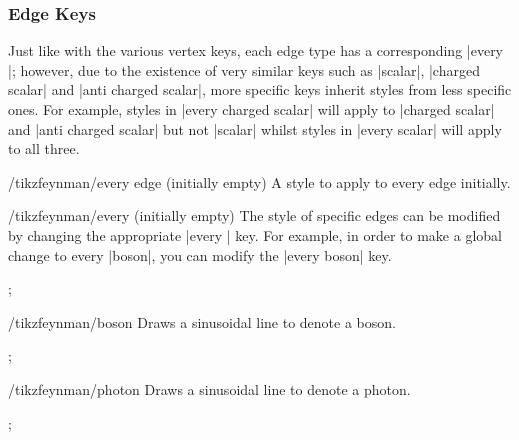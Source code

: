 \documentclass[a4paper,final]{ltxdoc}
\begin{document}
\subsubsection{Edge Keys}
\label{subsubsec:edge_keys}

Just like with the various vertex keys, each edge type has a corresponding
|every |; however, due to the existence of very similar keys
such as |scalar|, |charged scalar| and |anti charged scalar|, more specific keys
inherit styles from less specific ones.  For example, styles in
|every charged scalar| will apply to |charged scalar| and |anti charged scalar|
but not |scalar| whilst styles in |every scalar| will apply to all three.

\begin{stylekey}{/tikzfeynman/every edge (initially \normalfont empty)}
  A style to apply to every edge initially.
\end{stylekey}

\begin{stylekey}{/tikzfeynman/every  (initially \normalfont empty)}
  The style of specific edges can be modified by changing the appropriate
  |every | key.  For example, in order to make a global change
  to every |boson|, you can modify the |every boson| key.

\begin{codeexample}[]
;
\end{codeexample}
\end{stylekey}

\begin{key}{/tikzfeynman/boson}
  Draws a sinusoidal line to denote a boson.

\begin{codeexample}[]
;
\end{codeexample}
\end{key}

\begin{key}{/tikzfeynman/photon}
  Draws a sinusoidal line to denote a photon.

\begin{codeexample}[]
;
\end{codeexample}
\end{key}
\end{document}
